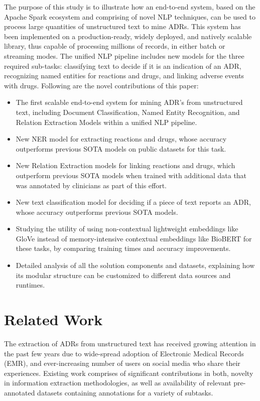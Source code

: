 \documentclass[letterpaper]{article}
\begin{document}
The purpose of this study is to illustrate how an end-to-end system, based on the Apache Spark ecosystem and comprising of novel NLP techniques, can be used to process large quantities of unstructured text to mine ADRs. This system has been implemented on a production-ready, widely deployed, and natively scalable library, thus capable of processing millions of records, in either batch or streaming modes. The unified NLP pipeline includes new models for the three required sub-tasks: classifying text to decide if it is an indication of an ADR, recognizing named entities for reactions and drugs, and linking adverse events with drugs. Following are the novel contributions of this paper: 

\begin{itemize}
 \item The first scalable end-to-end system for mining ADR's from unstructured text, including Document Classification, Named Entity Recognition, and Relation Extraction Models within a unified NLP pipeline.
 \item New NER model for extracting reactions and drugs, whose accuracy outperforms previous SOTA models on public datasets for this task.
 \item New Relation Extraction models for linking reactions and drugs, which outperform previous SOTA models when trained with additional data that was annotated by clinicians as part of this effort.
 \item New text classification model for deciding if a piece of text reports an ADR, whose accuracy outperforms previous SOTA models.
 \item Studying the utility of using non-contextual lightweight embeddings \cite{DBLP:journals/corr/abs-1301-3781} like GloVe \cite{pennington-etal-2014-glove} instead of memory-intensive contextual embeddings like BioBERT for these tasks, by comparing training times and accuracy improvements.
 \item Detailed analysis of all the solution components and datasets, explaining how its modular structure can be customized to different data sources and runtimes.
\end{itemize}

\section{Related Work}

The extraction of ADRs from unstructured text has received growing attention in the past few years due to wide-spread adoption of Electronic Medical Records (EMR), and ever-increasing number of users on social media who share their experiences. Existing work comprises of significant contributions in both, novelty in information extraction methodologies, as well as availability of relevant pre-annotated datasets containing annotations for a variety of subtasks.
\end{document}
